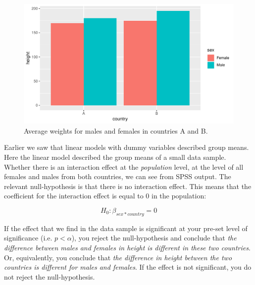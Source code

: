 \documentclass[]{book}\usepackage[]{graphicx}\usepackage[]{color}
\makeatletter
\def\maxwidth{ %
  \ifdim\Gin@nat@width>\linewidth
    \linewidth
  \else
    \Gin@nat@width
  \fi
}
\newenvironment{knitrout}{}{} %
\makeatother
\begin{document}
\begin{knitrout}
\color{fgcolor}\begin{figure}

{\centering \includegraphics[width=\maxwidth]{figure/country_sex2-1} 

}

\caption[Average weights for males and females in countries A and B]{Average weights for males and females in countries A and B.}\label{fig:country_sex2}
\end{figure}


\end{knitrout}


Earlier we saw that linear models with dummy variables described group means. Here the linear model described the group means of a small data sample. Whether there is an interaction effect at the \textit{population} level, at the level of all females and males from both countries, we can see from SPSS output. The relevant null-hypothesis is that there is no interaction effect. This means that the coefficient for the interaction effect is equal to 0 in the population:

\begin{equation}
H_0: \beta_{sex*country}=0
\end{equation}

If the effect that we find in the data sample is significant at your pre-set level of significance (i.e. $p < \alpha$), you reject the null-hypothesis and conclude that \textit{the difference between males and females in height is different in these two countries}. Or, equivalently, you conclude that \textit{the difference in height between the two countries is different for males and females}. If the effect is not significant, you do not reject the null-hypothesis.
\end{document}
